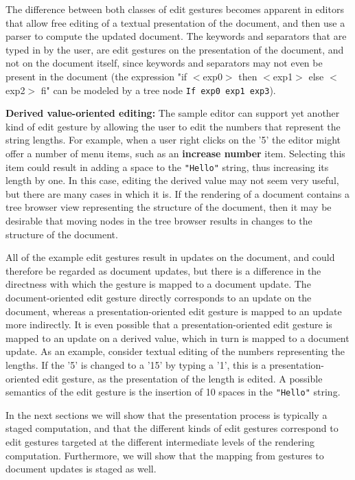 The difference between both classes of edit gestures becomes apparent in editors that allow free editing of a textual presentation of the document, and then use a parser to compute the updated document. The keywords and separators that are typed in by the user, are edit gestures on the presentation of the document, and not on the document itself, since keywords and separators may not even be present in the document (the expression "if $<$exp0$>$ then $<$exp1$>$ else $<$exp2$>$ fi" can be modeled by a tree node \texttt{If exp0 exp1 exp3}).

{\bf Derived value-oriented editing: }The sample editor can support yet another kind of edit gesture by allowing the user to edit the numbers that represent the string lengths. For example, when a user right clicks on the '5' the editor might offer a number of menu items, such as an {\bf increase number} item. Selecting this item could result in adding a space to the \texttt{"Hello"} string, thus increasing its length by one. In this case, editing the derived value may not seem very useful, but there are many cases in which it is. If the rendering of a document contains a tree browser view representing the structure of the document, then it may be desirable that moving nodes in the tree browser results in changes to the structure of the document.

\bigskip All of the example edit gestures result in updates on the document, and could therefore be regarded as document updates, but there is a difference in the directness with which the gesture is mapped to a document update. The document-oriented edit gesture directly corresponds to an update on the document, whereas a presentation-oriented edit gesture is mapped to an update more indirectly. It is even possible that a presentation-oriented edit gesture is mapped to an update on a derived value, which in turn is mapped to a document update. As an example, consider textual editing of the numbers representing the lengths. If the '5' is changed to a '15' by typing a '1', this is a presentation-oriented edit gesture, as the presentation of the length is edited. A possible semantics of the edit gesture is the insertion of 10 spaces in the \texttt{"Hello"} string.

In the next sections we will show that the presentation process is typically a staged computation, and that the different kinds of edit gestures correspond to edit gestures targeted at the different intermediate levels of the rendering computation. Furthermore, we will show that the mapping from gestures to document updates is staged as well. 

